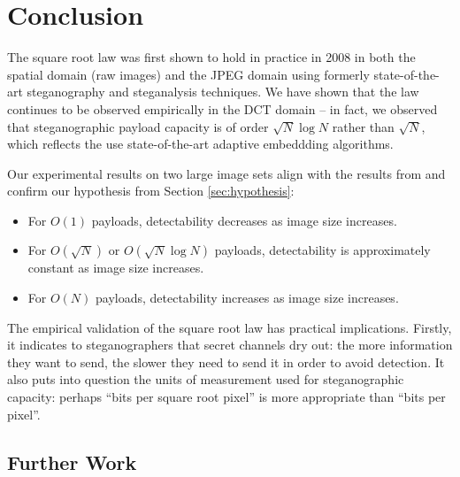 \documentclass[11pt,a4paper,twoside,openright]{report}
\begin{document}
\chapter{Conclusion}


The square root law was first shown to hold in practice in 2008 \cite{2008-paper} in both the spatial domain (raw images) and the JPEG domain using formerly state-of-the-art steganography and steganalysis techniques. We have shown that the law continues to be observed empirically in the DCT domain -- in fact, we observed that steganographic payload capacity is of order $\sqrt{N} \log{N}$ rather than $\sqrt{N}$, which reflects the use state-of-the-art adaptive embeddding algorithms.

Our experimental results on two large image sets align with the results from \cite{2008-paper} and confirm our hypothesis from Section \ref{sec:hypothesis}:
\begin{itemize}
	\item For $O(1)$ payloads, detectability decreases as image size increases.
	\item For $O(\sqrt{N})$ or $O(\sqrt{N} \log{N})$ payloads, detectability is approximately constant as image size increases.
	\item For $O(N)$ payloads, detectability increases as image size increases.
\end{itemize}

The empirical validation of the square root law has practical implications. Firstly, it indicates to steganographers that secret channels dry out: the more information they want to send, the slower they need to send it in order to avoid detection. It also puts into question the units of measurement used for steganographic capacity: perhaps ``bits per square root pixel'' is more appropriate than ``bits per pixel''.



\section{Further Work} \label{sec:further-work}
\end{document}
